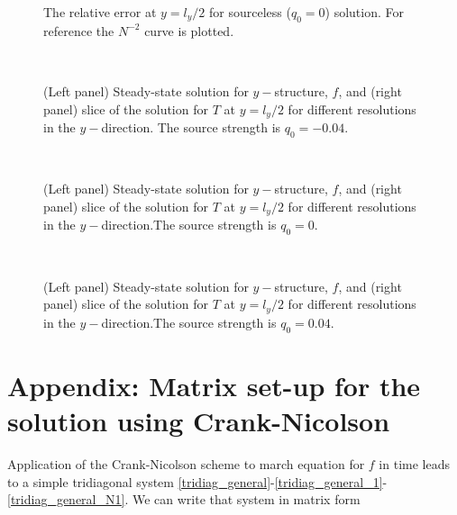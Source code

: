 \documentclass[11pt]{article}
\begin{document}
\begin{enumerate}[label=(\alph*)]
        \begin{figure}[h]
           \centerline{}
           \caption{The relative error at $y=l_y/2$ for sourceless ($q_0=0$) solution. For reference the $N^{-2}$ curve is plotted.}
        \label{error_cn}
        \end{figure}

        \begin{figure}[p]
        \centerline{\\
        }
        \caption{(Left panel) Steady-state solution for $y-$structure, $f$, and (right panel) slice of the solution for $T$ at $y=l_y/2$ for different resolutions in the $y-$direction. The source strength is $q_0=-0.04$.}
        \label{soln_cn_various_N_1}
        \end{figure}

       \begin{figure}[p]
        \centerline{\\
        }
        \caption{(Left panel) Steady-state solution for $y-$structure, $f$, and (right panel) slice of the solution for $T$ at $y=l_y/2$ for different resolutions in the $y-$direction.The source strength is $q_0=0$.}
        \label{soln_cn_various_N_2}
        \end{figure}

       \begin{figure}[p]
        \centerline{\\
        }
        \caption{(Left panel) Steady-state solution for $y-$structure, $f$, and (right panel) slice of the solution for $T$ at $y=l_y/2$ for different resolutions in the $y-$direction.The source strength is $q_0=0.04$.}
        \label{soln_cn_various_N_2}
        \end{figure}




\end{enumerate}


\newpage
\section*{Appendix: Matrix set-up for the solution using Crank-Nicolson}

Application of the Crank-Nicolson scheme to march equation for $f$ in time leads to a simple tridiagonal system \eqref{tridiag_general}-\eqref{tridiag_general_1}-\eqref{tridiag_general_N1}. We can write that system in matrix form 
\end{document}
